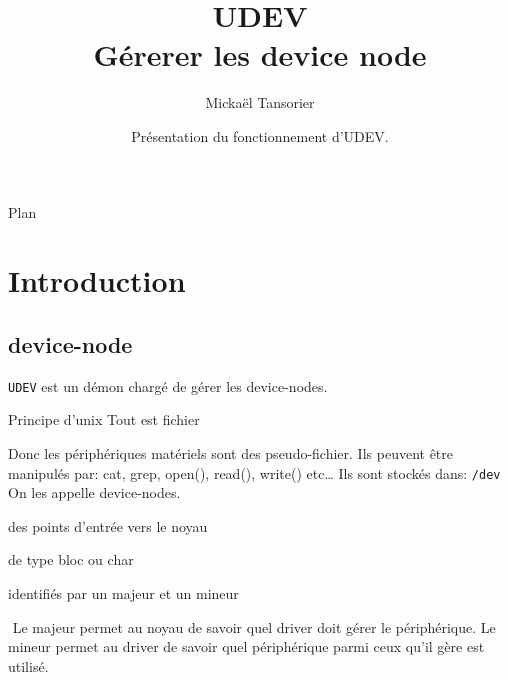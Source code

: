 \documentclass[compress,aspectratio=169]{beamer}
\title[U-Boot]{UDEV \\ \textbf{Gérerer les device node}}
\author[Mickaël Tansorier]{Mickaël Tansorier}
\date[Août 2018]{Présentation du fonctionnement d'UDEV.}
\begin{document}


\begin{frame}
\titlepage
\end{frame}



\begin{frame}{Plan}
\tableofcontents[hideallsubsections]
\end{frame}

\section{Introduction}

\subsection{device-node}

\begin{frame}
\texttt{UDEV} est un démon chargé de gérer les device-nodes.
\begin{block}{Principe d'unix}
Tout est fichier
\end{block}
Donc les périphériques matériels sont des pseudo-fichier.\newline
Ils peuvent être manipulés par: cat, grep, open(), read(), write() etc…\newline
\newline
Ils sont stockés dans: \texttt{/dev} \newline
On les appelle device-nodes.
\end{frame}

\begin{frame}
\begin{list}{-}{Les device nodes sont:}
\item des points d'entrée vers le noyau
\item de type bloc ou char
\item identifiés par un majeur et un mineur
\end{list}
$ $\newline
Le majeur permet au noyau de savoir quel driver doit gérer le périphérique.\newline
Le mineur permet au driver de savoir quel périphérique parmi ceux qu’il gère est utilisé.

	\end{frame}
\end{document}
